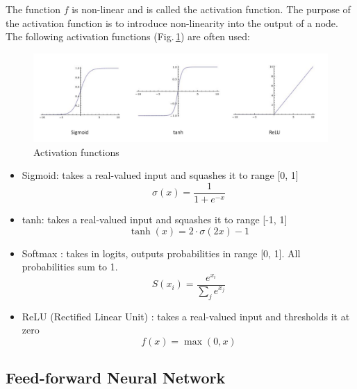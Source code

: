 The function $f$ is non-linear and is called the activation function. The purpose of the activation function is to introduce non-linearity into the output of a node. The following activation functions (Fig.\,\ref{activation}) are often used:
\begin{figure}
	\centering
	\includegraphics[scale=0.5]{Figs/activation.png}
    \caption{Activation functions}
    \label{activation}
\end{figure}

\begin{itemize}
  \item Sigmoid: takes a real-valued input and squashes it to range [0, 1]
        \begin{equation}
        \label{eq:sigmoid}
        \sigma(x) =  \frac{\mathrm{1} }{\mathrm{1} + e^{-x} }
        \end{equation}
  \item tanh: takes a real-valued input and squashes it to range [-1, 1]
  \begin{equation}
        \label{eq:tanh}
        \tanh(x) = 2\cdot\sigma(2x)-1 
        \end{equation}{}
  \item Softmax \citep{Goodfellow-et-al-2016}: takes in logits, outputs probabilities in range [0, 1]. All probabilities sum to 1. 
        \begin{equation}
        \label{eq:softmax}
        S(x_i) = \frac{e^{x_i}}{\sum_j e^{x_j}}
        \end{equation}
\item ReLU (Rectified Linear Unit) \citep{Nair:2010:RLU:3104322.3104425}: takes a real-valued input and thresholds it at zero
        \begin{equation}
        \label{eq:relu}
            f(x) = \max(0,x)
        \end{equation}
\end{itemize}

\subsection{Feed-forward Neural Network}

